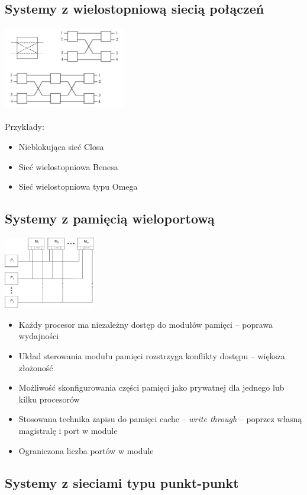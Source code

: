 	\subsection{Systemy z wielostopniową siecią połączeń}
		\includegraphics[width=0.4\textwidth]{./images/wieloproc03}\\\\
		Przykłady:
		\begin{itemize}
			\item Nieblokująca sieć Closa
			\item Sieć wielostopniowa Benesa
			\item Sieć wielostopniowa typu Omega
		\end{itemize}
	\subsection{Systemy z pamięcią wieloportową}
		\includegraphics[width=0.3\textwidth]{./images/wieloproc04}
		\begin{itemize}
			\item Każdy procesor ma niezależny dostęp do modułów pamięci – poprawa wydajności
			\item Układ sterowania modułu pamięci rozstrzyga konflikty dostępu – większa złożoność
			\item Możliwość skonfigurowania części pamięci jako prywatnej dla jednego lub kilku procesorów
			\item Stosowana technika zapisu do pamięci cache – \emph{write through} – poprzez własną magistralę i port w module
			\item Ograniczona liczba portów w module
		\end{itemize}
	\subsection{Systemy z sieciami typu punkt-punkt}
